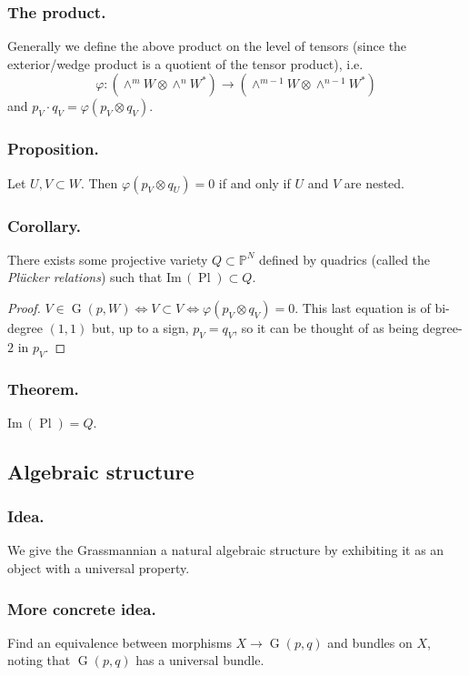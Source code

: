 \documentclass[10pt]{article}
\numberwithin{equation}{subsubsection}
\DeclareMathOperator{\G}{G}
\DeclareMathOperator{\Pl}{Pl}
\renewcommand{\P}{\mathbb{P}}
\renewcommand{\Im}{\mathrm{Im}\,}
\begin{document}
            \subsubsection{The product.} Generally we define the above product on the level of tensors (since the exterior/wedge product is a quotient of the tensor product), i.e. \[\varphi\colon(\wedge^mW\otimes\wedge^nW^*)\to(\wedge^{m-1}W\otimes\wedge^{n-1}W^*)\] and $p_V\cdot q_V=\varphi(p_V\otimes q_V)$.
            
            \subsubsection{Proposition.} Let $U,V\subset W$. Then $\varphi(p_V\otimes q_U)=0$ if and only if $U$ and $V$ are nested.
            
            \subsubsection{Corollary.} There exists some projective variety $Q\subset\P^N$ defined by quadrics (called the \textit{Plücker relations}) such that $\Im(\Pl)\subset Q$.
            \begin{proof}
                $V\in\G(p,W) \iff V\subset V \iff \varphi(p_V\otimes q_V)=0$. This last equation is of bi-degree $(1,1)$ but, up to a sign, $p_V=q_V$, so it can be thought of as being degree-$2$ in $p_V$.
            \end{proof}
            
            \subsubsection{Theorem.} $\Im(\Pl)=Q$.
        
        \subsection{Algebraic structure}
        
            \subsubsection{Idea.} We give the Grassmannian a natural algebraic structure by exhibiting it as an object with a universal property.
            
            \subsubsection{More concrete idea.} Find an equivalence between morphisms $X\to\G(p,q)$ and bundles on $X$, noting that $\G(p,q)$ has a universal bundle.
            
\end{document}
